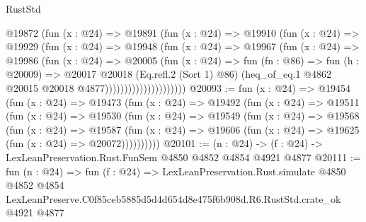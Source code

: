 \begin{lexlean}{RustStd}
\begin{coremodule}
                          @19872
                            (fun (x : @24) =>
                            @19891
                              (fun (x : @24) =>
                              @19910
                                (fun (x : @24) =>
                                @19929
                                  (fun (x : @24) =>
                                  @19948
                                    (fun (x : @24) =>
                                    @19967
                                      (fun (x : @24) =>
                                      @19986
                                        (fun (x : @24) =>
                                        @20005
                                          (fun (x : @24) =>
                                          fun (fn : @86) =>
                                          fun (h : @20009) =>
                                          @20017
                                            @20018
                                            (Eq.refl.{2} (Sort 1) @86)
                                            (heq_of_eq.{1}
                                              @4862
                                              @20015
                                              @20018
                                              @4877)))))))))))))))))))))
@20093 := fun (x : @24) =>
  @19454
    (fun (x : @24) =>
    @19473
      (fun (x : @24) =>
      @19492
        (fun (x : @24) =>
        @19511
          (fun (x : @24) =>
          @19530
            (fun (x : @24) =>
            @19549
              (fun (x : @24) =>
              @19568
                (fun (x : @24) =>
                @19587
                  (fun (x : @24) =>
                  @19606 (fun (x : @24) => @19625 (fun (x : @24) => @20072))))))))))
@20101 := (n : @24) -> (f : @24) -> LexLeanPreservation.Rust.FunSem @4850 @4852 @4854 @4921 @4877
@20111 := fun (n : @24) =>
  fun (f : @24) =>
  LexLeanPreservation.Rust.simulate
    @4850
    @4852
    @4854
    LexLeanPreserve.C0f85ceb5885d5d4d654d8e475f6b908d.R6.RustStd.crate_ok
    @4921
    @4877
\end{coremodule}
\end{lexlean}
